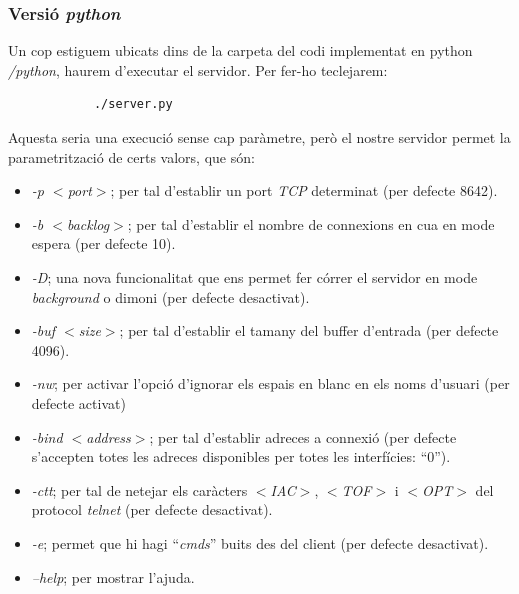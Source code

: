 \documentclass[a4paper,10pt]{article}
\begin{document}
		\subsubsection{Versió \emph{python}}
		Un cop estiguem ubicats dins de la carpeta del codi implementat en python \emph{/python}, haurem d'executar el servidor. Per fer-ho teclejarem:
			\begin{verbatim}
			./server.py 
			\end{verbatim}
		Aquesta seria una execució sense cap paràmetre, però el nostre servidor permet la parametrització de certs valors, que són:
			\begin{itemize}
			\item \emph{-p $<$port$>$}; per tal d'establir un port \emph{TCP} determinat (per defecte 8642).
			\item \emph{-b $<$backlog$>$}; per tal d'establir el nombre de connexions en cua en mode espera (per defecte 10).
			\item \emph{-D}; una nova funcionalitat que ens permet fer córrer el servidor en mode \emph{background} o dimoni (per defecte desactivat).
			\item \emph{-buf $<$size$>$}; per tal d'establir el tamany del buffer d'entrada (per defecte 4096).
			\item \emph{-nw}; per activar l'opció d'ignorar els espais en blanc en els noms d'usuari (per defecte activat)
			\item \emph{-bind $<$address$>$}; per tal d'establir adreces a connexió (per defecte s'accepten totes les adreces disponibles per totes les interfícies: ``0'').
			\item \emph{-ctt}; per tal de netejar els caràcters \emph{$<$IAC$>$}, \emph{$<$TOF$>$} i \emph{$<$OPT$>$} del protocol \emph{telnet} (per defecte desactivat).
			\item \emph{-e}; permet que hi hagi ``\emph{cmds}'' buits des del client (per defecte desactivat).
			\item \emph{--help}; per mostrar l'ajuda.
			\end{itemize}
\end{document}
